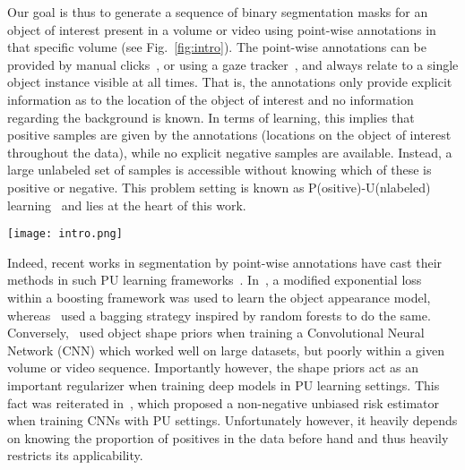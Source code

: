 Our goal is thus to generate a sequence of binary segmentation masks for an object of interest present in a volume or video using point-wise annotations in that specific volume (see Fig.~\ref{fig:intro}). The point-wise annotations can be provided by manual clicks~\cite{ferreira12,bearman16,lejeune18}, or using a gaze tracker~\cite{vilarino2007,khosravan16,lejeune17,lejeune18}, and always relate to a single object instance visible at all times. That is, the annotations only provide explicit information as to the location of the object of interest and no information regarding the background is known. In terms of learning, this implies that positive samples are given by the annotations (\ie locations on the object of interest throughout the data), while no explicit negative samples are available. Instead, a large unlabeled set of samples is accessible without knowing which of these is positive or negative. This problem setting is known as P(ositive)-U(nlabeled) learning~\cite{li03,li05,duplessis14,duplessis15} and lies at the heart of this work.

\begin{figure*}[t]
\centering
\texttt{[image: intro.png]}
\caption{Examples of image frames in different imaging modalities with different objects of interest to segment. In each example, a 2D point annotation is show in green and the complete pixel-wise groundtruth segmentation is shown in red. Applications shown are (from left to right): Video frame of a surgical instrument during minimally invasive surgery, a single slice from a CT scan depicting a human cochlea, video frame from a slitlamp examination of the optic nerve, brain slice from an MRI scan showing a tumor.}
\label{fig:intro}
\end{figure*}

Indeed, recent works in segmentation by point-wise annotations have cast their methods in such PU learning frameworks~\cite{bearman16,lejeune17,lejeune18}. In~\cite{lejeune17}, a modified exponential loss within a boosting framework was used to learn the object appearance model, whereas~\cite{lejeune18} used a bagging strategy inspired by random forests to do the same. Conversely,~\cite{bearman16} used object shape priors when training a Convolutional Neural Network (CNN) which worked well on large datasets, but poorly within a given volume or video sequence. Importantly however, the shape priors act as an important regularizer when training deep models in PU learning settings. This fact was reiterated in~\cite{kiryo17}, which proposed a non-negative unbiased risk estimator when training CNNs with PU settings. Unfortunately however, it heavily depends on knowing the proportion of positives in the data before hand and thus heavily restricts its applicability.

